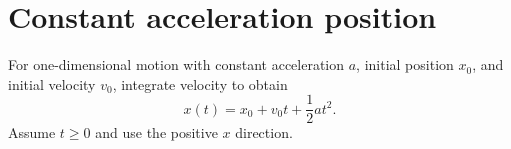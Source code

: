 %
%
%
%

\section*{Constant acceleration position}
For one-dimensional motion with constant acceleration $a$, initial position
$x_0$, and initial velocity $v_0$, integrate velocity to obtain
\[
  x(t)=x_0+v_0t+\frac{1}{2}at^2.
\]
Assume $t\ge 0$ and use the positive $x$ direction.
